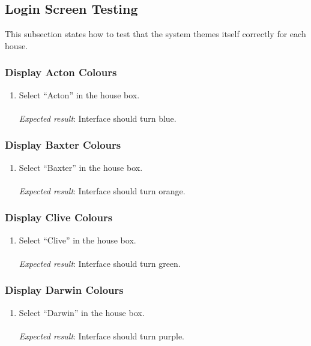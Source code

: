 \subsection{Login Screen Testing} %
\label{sub:login_screen_testing}
This subsection states how to test that the system themes itself correctly for each house.

\subsubsection{Display Acton Colours} %
\label{ssub:display_acton_colours}
\begin{enumerate}[leftmargin=*]
\item Select ``Acton'' in the house box.\\\\
\textit{Expected result}: Interface should turn blue.
\end{enumerate}

\subsubsection{Display Baxter Colours} %
\label{ssub:display_baxter_colours}
\begin{enumerate}[leftmargin=*]
\item Select ``Baxter'' in the house box.\\\\
\textit{Expected result}: Interface should turn orange.
\end{enumerate}

\subsubsection{Display Clive Colours} %
\label{ssub:display_clive_colours}
\begin{enumerate}[leftmargin=*]
\item Select ``Clive'' in the house box.\\\\
\textit{Expected result}: Interface should turn green.
\end{enumerate}

\subsubsection{Display Darwin Colours} %
\label{ssub:display_darwin_colours}
\begin{enumerate}[leftmargin=*]
\item Select ``Darwin'' in the house box.\\\\
\textit{Expected result}: Interface should turn purple.
\end{enumerate}

